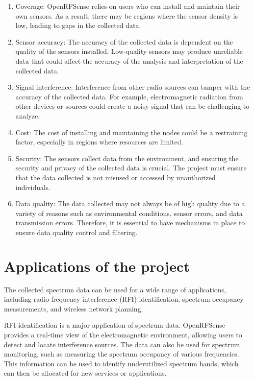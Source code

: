 \documentclass[
  letterpaper,
  a4paper,
  12pt,
  titlepage,
  oneside,
  openany]{book}
\providecommand{\tightlist}{%
  \setlength{\itemsep}{0pt}\setlength{\parskip}{0pt}}\usepackage{longtable,booktabs,array}
\begin{document}
\begin{enumerate}
\def\labelenumi{\arabic{enumi}.}
\tightlist
\item
  Coverage: OpenRFSense relies on users who can install and maintain
  their own sensors. As a result, there may be regions where the sensor
  density is low, leading to gaps in the collected data.
\item
  Sensor accuracy: The accuracy of the collected data is dependent on
  the quality of the sensors installed. Low-quality sensors may produce
  unreliable data that could affect the accuracy of the analysis and
  interpretation of the collected data.
\item
  Signal interference: Interference from other radio sources can tamper
  with the accuracy of the collected data. For example, electromagnetic
  radiation from other devices or sources could create a noisy signal
  that can be challenging to analyze.
\item
  Cost: The cost of installing and maintaining the nodes could be a
  restraining factor, especially in regions where resources are limited.
\item
  Security: The sensors collect data from the environment, and ensuring
  the security and privacy of the collected data is crucial. The project
  must ensure that the data collected is not misused or accessed by
  unauthorized individuals.
\item
  Data quality: The data collected may not always be of high quality due
  to a variety of reasons such as environmental conditions, sensor
  errors, and data transmission errors. Therefore, it is essential to
  have mechanisms in place to ensure data quality control and filtering.
\end{enumerate}

\hypertarget{applications-of-the-project}{%
\section{Applications of the
project}\label{applications-of-the-project}}

The collected spectrum data can be used for a wide range of
applications, including radio frequency interference (RFI)
identification, spectrum occupancy measurements, and wireless network
planning.

RFI identification is a major application of spectrum data. OpenRFSense
provides a real-time view of the electromagnetic environment, allowing
users to detect and locate interference sources. The data can also be
used for spectrum monitoring, such as measuring the spectrum occupancy
of various frequencies. This information can be used to identify
underutilized spectrum bands, which can then be allocated for new
services or applications.
\end{document}
